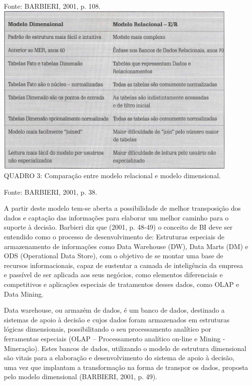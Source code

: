 \documentclass[a4paper]{article}
\begin{document}
{
\textsf{Fonte: BARBIERI, 2001, p. 108.\newline
} \includegraphics[width=12.065cm,height=8.597cm]{monograph-img004.jpg} \textsf{\MakeUppercase{ \newline
QUADRO }}\textsf{3: Compara\c{c}\~ao entre modelo relacional e modelo dimensional. }}

{\sffamily
Fonte: BARBIERI, 2001, p. 38. }

{
\textsf{A partir deste modelo tem-se aberta a possibilidade de melhor transposi\c{c}\~ao dos dados e capta\c{c}\~ao das
informa\c{c}\~oes para elaborar um melhor caminho para o suporte \`a decis\~ao. Barbieri diz que (2001, p. 48-49) o
conceito de BI deve ser entendido como o processo de desenvolvimento de: Estruturas especiais de armazenamento de
informa\c{c}\~oes como Data Warehouse (DW), Data Marts (DM) e ODS (Operational Data Store), com o objetivo de se montar
uma base de recursos informacionais, capaz de sustentar a camada de intelig\^encia da empresa e pass\'ivel de ser
aplicada aos seus neg\'ocios, como elementos diferenciais e competitivos e aplica\c{c}\~oes especiais de tratamentos
desses dados, como OLAP e Data Mining.}}

{
\textsf{Data warehouse, ou armaz\'em de dados, \'e um banco de dados, destinado a sistemas de apoio \`a decis\~ao e
cujos dados foram armazenados em estruturas l\'ogicas dimensionais, possibilitando o seu processamento anal\'itico por
ferramentas especiais (OLAP -- Processamento anal\'itico on-line e Mining - Minera\c{c}\~ao). Estes bancos de dados,
utilizando o modelo de estrutura dimensional s\~ao vitais para a elabora\c{c}\~ao e desenvolvimento do sistema de apoio
\`a decis\~ao, uma vez que implantam a transforma\c{c}\~ao na forma de transpor os dados, proposta pelo modelo
dimensional (BARBIERI, 2001, p. 49). }}
\end{document}
